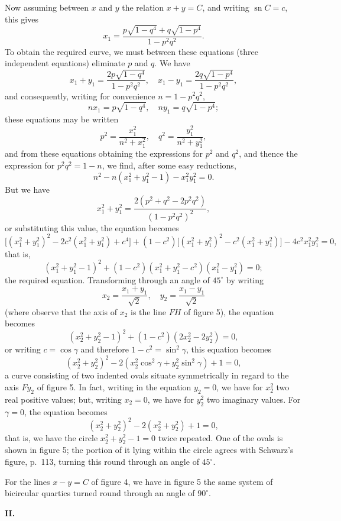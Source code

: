 \documentclass[12pt,a4paper]{article}
\begin{document}
Now assuming between $x$ and $y$ the relation $x + y = C$, and writing $\operatorname{sn} C = c$, this gives
\[
x_1 = \frac{p\sqrt{1-q^4} + q\sqrt{1-p^4}}{1-p^2q^2}.
\]
To obtain the required curve, we must between these equations (three independent
equations) eliminate $p$ and $q$. We have
\[
x_1 + y_1 = \frac{2p\sqrt{1-q^4}}{1-p^2q^2},
\quad
x_1 - y_1 = \frac{2q\sqrt{1-p^4}}{1-p^2q^2},
\]
and consequently, writing for convenience $n = 1 - p^2q^2$,
\[
nx_1 = p\sqrt{1-q^4}, \quad ny_1 = q\sqrt{1-p^4};
\]
these equations may be written
\[
p^2 = \frac{x_1^2}{n^2 + x_1^2}, \quad q^2 = \frac{y_1^2}{n^2 + y_1^2},
\]
and from these equations obtaining the expressions for $p^2$ and $q^2$, and thence the
expression for $p^2q^2 = 1 - n$, we find, after some easy reductions,
\[
n^2 - n(x_1^2 + y_1^2 - 1) - x_1^2y_1^2 = 0.
\]
But we have
\[
x_1^2 + y_1^2 = \frac{2(p^2 + q^2 - 2p^2q^2)}{(1-p^2q^2)^2},
\]
or substituting this value, the equation becomes
\[
\bigl[(x_1^2 + y_1^2)^2 - 2c^2(x_1^2 + y_1^2) + c^4\bigr] + (1-c^2)\bigl[(x_1^2 + y_1^2)^2 - c^2(x_1^2 + y_1^2)\bigr] - 4c^2x_1^2y_1^2 = 0,
\]
that is,
\[
(x_1^2 + y_1^2 - 1)^2 + (1-c^2)(x_1^2 + y_1^2 - c^2)(x_1^2 - y_1^2) = 0;
\]
the required equation. Transforming through an angle of $45^\circ$ by writing
\[
x_2 = \frac{x_1 + y_1}{\sqrt{2}}, \quad y_2 = \frac{x_1 - y_1}{\sqrt{2}}
\]
(where observe that the axis of $x_2$ is the line $FH$ of figure 5), the equation becomes
\[
(x_2^2 + y_2^2 - 1)^2 + (1-c^2)(2x_2^2 - 2y_2^2) = 0,
\]
or writing $c = \cos\gamma$ and therefore $1 - c^2 = \sin^2\gamma$, this equation becomes
\[
(x_2^2 + y_2^2)^2 - 2(x_2^2\cos^2\gamma + y_2^2\sin^2\gamma) + 1 = 0,
\]
a curve consisting of two indented ovals situate symmetrically in regard to the axis
$Fy_2$ of figure 5. In fact, writing in the equation $y_2 = 0$, we have for $x_2^2$ two real
positive values; but, writing $x_2 = 0$, we have for $y_2^2$ two imaginary values. For $\gamma=0$,
the equation becomes
\[
(x_2^2 + y_2^2)^2 - 2(x_2^2 + y_2^2) + 1 = 0,
\]
that is, we have the circle $x_2^2 + y_2^2 - 1 = 0$ twice repeated. One of the ovals is
shown in figure 5; the portion of it lying within the circle agrees with Schwarz's
figure, p.~113, turning this round through an angle of $45^\circ$.

For the lines $x - y = C$ of figure 4, we have in figure 5 the same system of
bicircular quartics turned round through an angle of $90^\circ$.

\bigskip
\textbf{II.}
\end{document}
